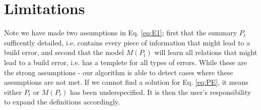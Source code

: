 \section{Limitations}

Note we have made two assumptions in Eq. \ref{eq:E1}; first that the summary $P_t$ sufficently detailed, i.e. contains every piece of information that might lead to a build error, and second that the model $M(P_t)$ will learn all relations that might lead to a build error, i.e. has a templete for all types of errors.
While these are the strong assumptions - our algorithm is able to detect cases where these assumptions are not met.
If we cannot find a solution for Eq. \ref{eq:PE}, it means either $P_t$ or $M(P_t)$ has been underspecified.
It is then the user's responsibility to expand the definitions accordingly.

